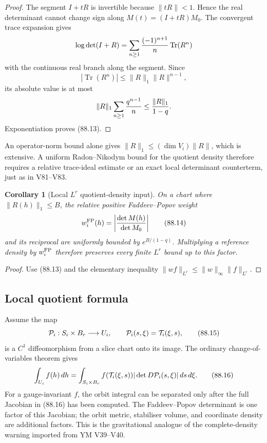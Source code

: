 \documentclass[11pt]{article}
\newtheorem{corollary}[theorem]{Corollary}
\begin{document}
\begin{proof}
The segment \(I+tR\) is invertible because
\(\|tR\|<1\).  Hence the real determinant cannot change sign along
\(M(t)=(I+tR)M_0\).  The convergent trace expansion gives
\[
 \log\det(I+R)=\sum_{n\ge1}{(-1)^{n+1}\over n}\operatorname{Tr}(R^n)
\]
with the continuous real branch along the segment.  Since
\[
 |\operatorname{Tr}(R^n)|
 \le\|R\|_1\|R\|^{n-1},
\]
its absolute value is at most
\[
 \|R\|_1\sum_{n\ge1}{q^{n-1}\over n}
 \le{\|R\|_1\over1-q}.
\]
Exponentiation proves (88.13).
\end{proof}

An operator-norm bound alone gives
\(\|R\|_1\le(\dim V_i)\|R\|\), which is extensive.  A uniform
Radon--Nikodym bound for the quotient density therefore requires a
relative trace-ideal estimate or an exact local determinant
counterterm, just as in V81--V83.

\begin{corollary}[Local \(L^r\) quotient-density input]
\label{cor:v11v88-density}
On a chart where \(\|R(h)\|_1\le B\), the relative positive
Faddeev--Popov weight
\[
                              w_i^{\rm FP}(h)
                              =\left|{\det M(h)\over\det M_0}\right|
                                                                    \tag{88.14}
\]
and its reciprocal are uniformly bounded by \(e^{B/(1-q)}\).
Multiplying a reference density by \(w_i^{\rm FP}\) therefore
preserves every finite \(L^r\) bound up to this factor.
\end{corollary}

\begin{proof}
Use (88.13) and the elementary inequality
\(\|wf\|_{L^r}\le\|w\|_\infty\|f\|_{L^r}\).
\end{proof}

\subsection{Local quotient formula}

Assume the map
\[
                    {\cal P}_i:S_i\times B_r\longrightarrow U_i,
              \qquad {\cal P}_i(s,\xi)={\cal T}_i(\xi,s),    \tag{88.15}
\]
is a \(C^1\) diffeomorphism from a slice chart onto its image.  The
ordinary change-of-variables theorem gives
\[
 \int_{U_i}f(h)\,dh
 =\int_{S_i\times B_r}
       f({\cal T}_i(\xi,s))
       |\det D{\cal P}_i(s,\xi)|\,ds\,d\xi.                  \tag{88.16}
\]
For a gauge-invariant \(f\), the orbit integral can be separated only
after the full Jacobian in (88.16) has been computed.  The
Faddeev--Popov determinant is one factor of this Jacobian; the orbit
metric, stabiliser volume, and coordinate density are additional
factors.  This is the gravitational analogue of the complete-density
warning imported from YM V39--V40.
\end{document}
